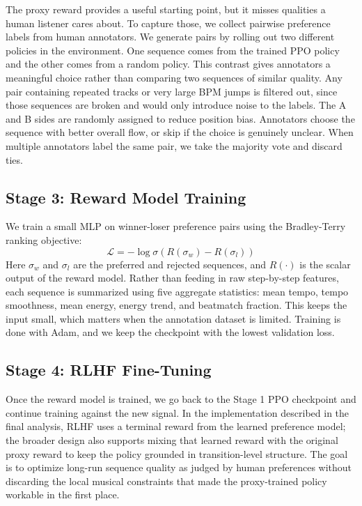 \documentclass{article}
\begin{document}
The proxy reward provides a useful starting point, but it misses qualities a human listener cares about. To capture those, we collect pairwise preference labels from human annotators. We generate pairs by rolling out two different policies in the environment. One sequence comes from the trained PPO policy and the other comes from a random policy. This contrast gives annotators a meaningful choice rather than comparing two sequences of similar quality. Any pair containing repeated tracks or very large BPM jumps is filtered out, since those sequences are broken and would only introduce noise to the labels. The A and B sides are randomly assigned to reduce position bias. Annotators choose the sequence with better overall flow, or skip if the choice is genuinely unclear. When multiple annotators label the same pair, we take the majority vote and discard ties.

\subsection{Stage 3: Reward Model Training}

We train a small MLP on winner-loser preference pairs using the Bradley-Terry ranking objective:
\begin{equation}
    \mathcal{L} = -\log \sigma\!\left(R(\sigma_w) - R(\sigma_l)\right)
\end{equation}
Here $\sigma_w$ and $\sigma_l$ are the preferred and rejected sequences, and $R(\cdot)$ is the scalar output of the reward model. Rather than feeding in raw step-by-step features, each sequence is summarized using five aggregate statistics: mean tempo, tempo smoothness, mean energy, energy trend, and beatmatch fraction. This keeps the input small, which matters when the annotation dataset is limited. Training is done with Adam, and we keep the checkpoint with the lowest validation loss.

\subsection{Stage 4: RLHF Fine-Tuning}

Once the reward model is trained, we go back to the Stage 1 PPO checkpoint and continue training against the new signal. In the implementation described in the final analysis, RLHF uses a terminal reward from the learned preference model; the broader design also supports mixing that learned reward with the original proxy reward to keep the policy grounded in transition-level structure. The goal is to optimize long-run sequence quality as judged by human preferences without discarding the local musical constraints that made the proxy-trained policy workable in the first place.
\end{document}
